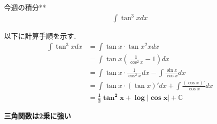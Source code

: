 \documentclass[main]{subfiles}
\begin{document}

\begin{mondai}{1}{今週の積分}{**}
    \begin{align*}
        \int \tan^3 x dx
    \end{align*}
\end{mondai}


\solutionhead
\hfill
以下に計算手順を示す.
\hfill\ 
\begin{align*}
    \int \tan ^3 x dx   
        &= \int \tan x \cdot \tan x ^2 x dx \\
        &= \int \tan x \left( \frac{1}{\cos ^2 x} -1 \right)  dx \\
        &= \int \tan x \cdot \frac{1}{\cos ^2 x} dx - \int \frac{\sin x}{\cos x} dx \\
        &= \int \tan x \cdot \left(\tan x\right)' dx + \int \frac{\left(\cos x\right)'}{\cos x} dx \\
        &= \boldsymbol{\frac{1}{2} \tan ^2 x + \log \left| \cos x \right| + \mathbb{C}}
\end{align*}

\begin{focusbox}
\centering
\textbf{三角関数は2乗に強い}
\end{focusbox}
\end{document}
